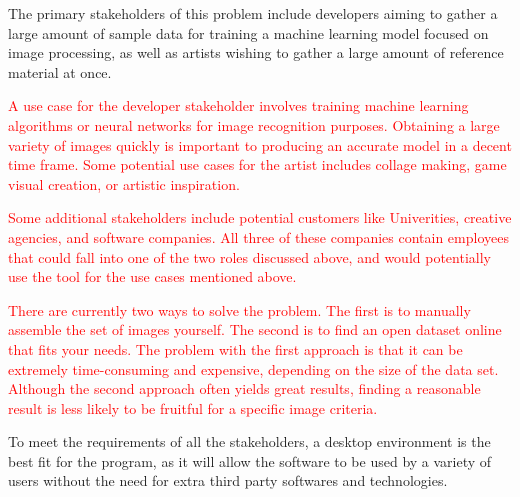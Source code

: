 \documentclass{article}
\begin{document}
The primary stakeholders of this problem include developers aiming to gather a large amount of sample data for training 
a machine learning model focused on image processing, as well as artists wishing to gather a large amount of 
reference material at once.

\textcolor{red}{A use case for the developer stakeholder involves training machine learning algorithms or 
neural networks for image recognition purposes. Obtaining a large variety of images quickly is important 
to producing an accurate model in a decent time frame. Some potential use cases for the artist includes collage making, 
game visual creation, or artistic inspiration.}

\textcolor{red}{Some additional stakeholders include potential customers like Univerities, creative agencies, 
and software companies. All three of these companies contain employees that could fall into one of the two 
roles discussed above, and would potentially use the tool for the use cases mentioned above.}

\textcolor{red}{There are currently two ways to solve the problem. The first is to manually assemble the set of images yourself. 
The second is to find an open dataset online that fits your needs. The problem with the first approach is that 
it can be extremely time-consuming and expensive, depending on the size of the data set. Although the second 
approach often yields great results, finding a reasonable result is less likely to be fruitful for a specific 
image criteria.}

To meet the requirements of all the stakeholders, a desktop environment is the best 
fit for the program, as it will allow the software to be used by a variety of users without the need for extra 
third party softwares and technologies.
\end{document}
